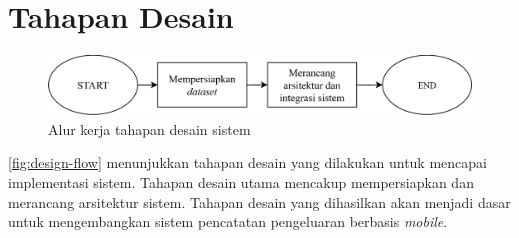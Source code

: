 \section{Tahapan Desain}
\label{sec:tahapan-desain}

\begin{figure}[htbp]
    \centering
    \includegraphics[width=1\textwidth]{images/design-flow.png}
    \caption{Alur kerja tahapan desain sistem}
    \label{fig:design-flow}
\end{figure}

\autoref{fig:design-flow} menunjukkan tahapan desain yang dilakukan untuk mencapai implementasi sistem. Tahapan desain utama mencakup mempersiapkan \dataset{} dan merancang arsitektur sistem. Tahapan desain yang dihasilkan akan menjadi dasar untuk mengembangkan sistem pencatatan pengeluaran berbasis \emph{mobile}.




